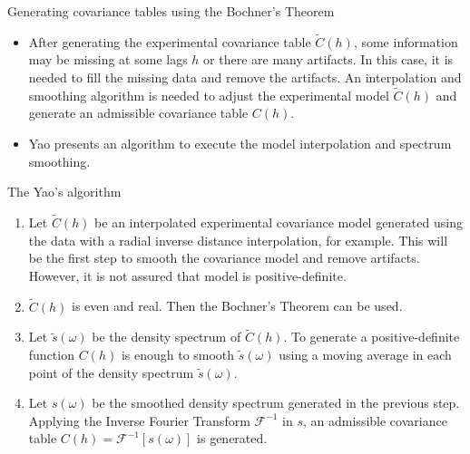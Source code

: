 \begin{frame}{Generating covariance tables using the Bochner's Theorem}

\begin{itemize}
\item After generating the experimental covariance table $\tilde{C}(h)$,  some information may be missing at some lags $h$ or there are many artifacts. In this case, it is needed to fill the missing data and remove the artifacts. An interpolation and smoothing algorithm is needed to adjust the experimental model $\tilde{C}(h)$ and generate an admissible covariance table $C(h)$. 

\item Yao \cite{cov.paper} presents an algorithm to execute the model interpolation and spectrum smoothing.
\end{itemize}

\end{frame}


\begin{frame}{The Yao's algorithm}

\begin{enumerate}
\item Let $\tilde{C}(h)$ be an interpolated experimental covariance model generated using the data with a radial inverse distance interpolation, for example. This will be the first step to smooth the covariance model and remove artifacts. However, it is not assured that model is positive-definite.
\item $\tilde{C}(h)$ is even and real. Then the Bochner's Theorem can be used.
\item Let $\tilde{s}(\omega)$ be the density spectrum of $\tilde{C}(h)$. To generate a positive-definite function $C(h)$ is enough to smooth $\tilde{s}(\omega)$ using a moving average in each point of the density spectrum $\tilde{s}(\omega)$. 
\item Let $s(\omega)$ be the smoothed density spectrum generated in the previous step. Applying the Inverse Fourier Transform $\mathscr{F}^{-1}$ in $s$, an admissible covariance table $C(h) = \mathscr{F}^{-1}[s(\omega)]$ is generated.
\end{enumerate}

\end{frame}


